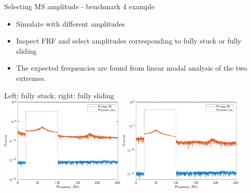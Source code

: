 \documentclass[9pt]{beamer}
\begin{document}
\begin{frame}{Selecting MS amplitude - benchmark 4 example}
  \begin{itemize}
  \item Simulate with different amplitudes
  \item Inspect FRF and select amplitudes corresponding to fully stuck or fully sliding
  \item The expected frequencies are found from linear modal analysis of the
    two extremes.
  \end{itemize}

  \begin{center}
    Left: fully stuck; right: fully sliding\\
    \includegraphics[width=0.45\textwidth]{fig/b4_famp01_ts}
    \includegraphics[width=0.45\textwidth]{fig/b4_famp05_ts}
  \end{center}
\end{frame}
\end{document}
